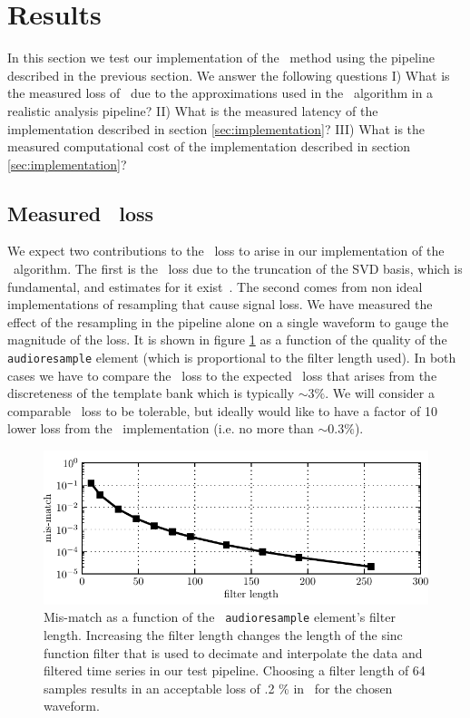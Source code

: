 \section{Results}
\label{SECIV}\label{sec:results}

In this section we test our implementation of the \lloid\ method using the
pipeline described in the previous section.  We answer the following questions
%
I) What is the measured loss of \SNR\ due to the approximations used in the
\lloid\ algorithm in a realistic analysis pipeline?
%
II) What is the measured latency of the implementation described in section
\ref{sec:implementation}?
%
III) What is the measured computational cost of the implementation described in
section \ref{sec:implementation}?

\subsection{Measured \SNR\ loss}

We expect two contributions to the \SNR\ loss to arise in our implementation of
the \lloid\ algorithm.  The first is the \SNR\ loss due to the truncation of
the SVD basis, which is fundamental, and estimates for it
exist~\cite{Cannon:2010p10398}.  The second comes from non ideal
implementations of resampling that cause signal loss.  We have measured the
effect of the resampling in the pipeline alone on a single waveform to gauge
the magnitude of the loss.  It is shown in figure \ref{fig:resamp_mm} as a
function of the quality of the {\tt audioresample} element (which is
proportional to the filter length used).  In both cases we have to compare the
\SNR\ loss to the expected \SNR\ loss that arises from the discreteness of the
template bank which is typically $\sim 3\%$.  We will consider a comparable
\SNR\ loss to be tolerable, but ideally would like to have a factor of 10 lower
loss from the \lloid\ implementation (i.e. no more than $\sim 0.3 \%$).  
%
\begin{figure}
\includegraphics{resamp_mm.pdf}
\caption{\label{fig:resamp_mm}Mis-match as a function of the {\tt
audioresample} element's filter length.  Increasing the filter length changes
the length of the sinc function filter that is used to decimate and interpolate
the data and filtered time series in our test pipeline.  Choosing a filter
length of 64 samples results in an acceptable loss of .2 \% in \SNR\ for the
chosen waveform.}
\end{figure}

